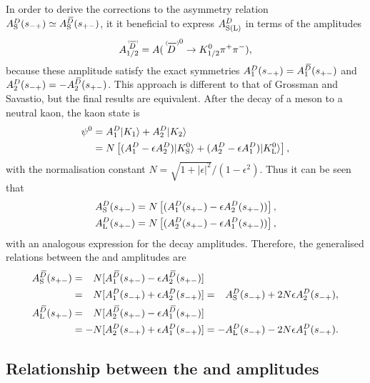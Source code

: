 
In order to derive the corrections to the asymmetry relation $A_{\rm S}^{D}(s_{-+})\simeq A_{\rm S}^{{\kern 0.18em\overline{\kern -0.18em D}}}(s_{+-})$, it it beneficial to express $A^{D}_\text{S(L)}$ in terms of the amplitudes
\begin{align}
   A_{1/2}^{\scaleto{\DorDbar}{9pt}} = 
   A({\DorDbar}^0\to K^0_\text{1/2} \pi^+\pi^-),
\end{align}
 because these amplitude satisfy the exact symmetries 
 $A_1^{{D}}(s_{-+}) = A_1^{{{\kern 0.18em\overline{\kern -0.18em D}}}}(s_{+-})$
and
 $A_2^{{D}}(s_{-+}) = -A_2^{{{\kern 0.18em\overline{\kern -0.18em D}}}}(s_{+-})$. This approach is different to that of Grossman and Savastio, but the final results are equivalent. 
 After the decay of a \Dz meson to a neutral kaon, the kaon state is
\begin{align}
\begin{split}
    \psi^0 &= A^{D}_1 |K_1\rangle + A^{D}_2|K_2\rangle \\
    &= N\left[(A^{D}_1-\epsilon A^{D}_2)|{{K}^0_{\mathrm{S}}}\rangle
    + (A^{D}_2-\epsilon A^{D}_1)|{{K}^0_{\mathrm{L}}}\rangle\right],
\end{split}
\end{align}
with the normalisation constant $N=\sqrt{1+|\epsilon|^2}/(1-\epsilon^2)$. Thus it can be seen that
\begin{align}
\begin{split}\label{eq:A12toKS}
    A^{D}_\text{S}(s_{+-}) &= N\left[(A^{D}_1(s_{+-})-\epsilon A^{D}_2(s_{+-}))\right], \\
    A^{D}_\text{L}(s_{+-}) &= N\left[(A^{D}_2(s_{+-})-\epsilon A^{D}_1(s_{+-}))\right],
\end{split}
\end{align}
with an analogous expression for the \Dzb decay amplitudes. Therefore, the  generalised relations between the \Dz and \Dzb amplitudes are
\begin{align}
\begin{split}\label{eq:DDbar_relations}
    A_{\rm S}^{{\kern 0.18em\overline{\kern -0.18em D}}}(s_{+-}) &= \phantom{-}N[A^{\kern 0.18em\overline{\kern -0.18em D}}_1(s_{+-})-\epsilon A^{\kern 0.18em\overline{\kern -0.18em D}}_2(s_{+-})]
    \\
    &= \phantom{-}N[A^{D}_1(s_{-+})+\epsilon A^{D}_2(s_{-+})]  = \phantom{-}A_{\rm S}^{D}(s_{-+}) + 2N\epsilon A^{D}_2(s_{-+}),
    \\
    A_{\rm L}^{{\kern 0.18em\overline{\kern -0.18em D}}}(s_{+-}) &= \phantom{-}N [A^{\kern 0.18em\overline{\kern -0.18em D}}_2(s_{+-})-\epsilon A^{\kern 0.18em\overline{\kern -0.18em D}}_1(s_{+-}) ]
    \\
    & = -N[A^{D}_2(s_{-+})+\epsilon A^{D}_1(s_{-+})] = -A_{\rm L}^{D}(s_{-+}) - 2N\epsilon A^{D}_1(s_{-+}).
\end{split}
\end{align} 

\subsection{\texorpdfstring{Relationship between the \KS and \KL amplitudes}{Relationship between the KS and KL amplitudes}} %
\label{sub:relationship_between_the_ks_and_kl_amplitudes}

